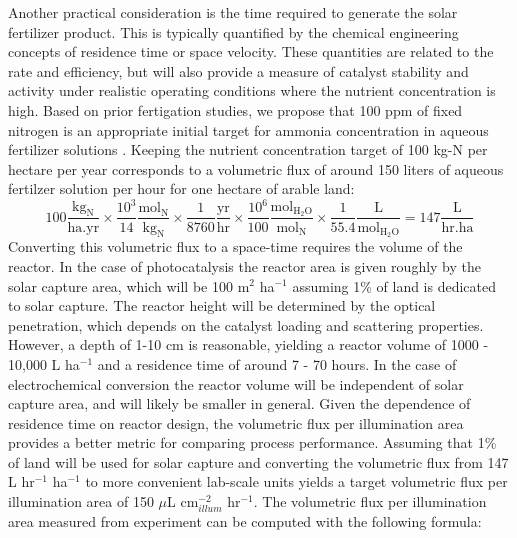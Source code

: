 Another practical consideration is the time required to generate the solar fertilizer product. This is typically quantified by the chemical engineering concepts of residence time or space velocity. These quantities are related to the rate and efficiency, but will also provide a measure of catalyst stability and activity under realistic operating conditions where the nutrient concentration is high. Based on prior fertigation studies, we propose that 100 ppm of fixed nitrogen is an appropriate initial target for ammonia concentration in aqueous fertilizer solutions \cite{phocaides2007handbook}. Keeping the nutrient concentration target of 100 kg-N per hectare per year corresponds to a volumetric flux of around 150 liters of aqueous fertilzer solution per hour for one hectare of arable land:
\begin{equation}
\mathrm{
100 \frac{kg_N}{ha . yr} \times \frac{10^3}{14} \frac{mol_{N}}{kg_N} \times \frac{1}{8760} \frac{yr}{hr} \times \frac{10^6}{100} \frac{mol_{H_2O}}{mol_{N}} \times \frac{1}{55.4} \frac{L}{mol_{H_2O}} = 147 \frac{L}{hr . ha} 
}
\end{equation}
Converting this volumetric flux to a space-time requires the volume of the reactor. In the case of photocatalysis the reactor area is given roughly by the solar capture area, which will be 100 m$^2$ ha$^{-1}$ assuming 1\% of land is dedicated to solar capture. The reactor height will be determined by the optical penetration, which depends on the catalyst loading and scattering properties. However, a depth of 1-10 cm is reasonable, yielding a reactor volume of 1000 - 10,000 L ha$^{-1}$ and a residence time of around 7 - 70 hours. In the case of electrochemical conversion the reactor volume will be independent of solar capture area, and will likely be smaller in general. Given the dependence of residence time on reactor design, the volumetric flux per illumination area provides a better metric for comparing process performance. Assuming that 1\% of land will be used for solar capture and converting the volumetric flux from 147 L hr$^{-1}$ ha$^{-1}$ to more convenient lab-scale units yields a target volumetric flux per illumination area of 150 $\mu$L cm$^{-2}_{illum}$ hr$^{-1}$. The volumetric flux per illumination area measured from experiment can be computed with the following formula:

